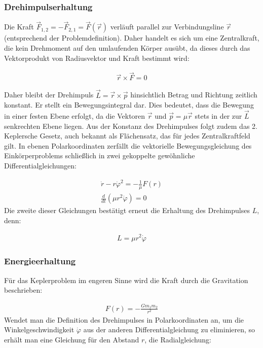 \documentclass[a4paper,12pt,twoside]{article}
\begin{document}
\subsubsection{Drehimpulserhaltung}

Die Kraft \( \vec{F}_{1,2} = -\vec{F}_{2,1} = \vec{F}(\vec{r}) \) verläuft parallel zur Verbindungsline \( \vec{r} \) (entsprechend der Problemdefinition). Daher handelt es sich um eine Zentralkraft, die kein Drehmoment auf den umlaufenden Körper ausübt, da dieses durch das Vektorprodukt von Radiusvektor und Kraft bestimmt wird:

\begin{align*}
	\vec{r} \times \vec{F} = 0
\end{align*}

Daher bleibt der Drehimpuls \( \vec{L} = \vec{r} \times \vec{p} \) hinsichtlich Betrag und Richtung zeitlich konstant. Er stellt ein Bewegungsintegral dar. Dies bedeutet, dass die Bewegung in einer festen Ebene erfolgt, da die Vektoren \( \vec{r} \) und \( \vec{p} = \mu \vec{r} \) stets in der zur \( \vec{L} \) senkrechten Ebene liegen.
Aus der Konstanz des Drehimpulses folgt zudem das 2. Keplersche Gesetz, auch bekannt als Flächensatz, das für jedes Zentralkraftfeld gilt. In ebenen Polarkoordinaten zerfällt die vektorielle Bewegungsgleichung des Einkörperproblems schließlich in zwei gekoppelte gewöhnliche Differentialgleichungen:

\begin{align*}
	\dot{r} - r \dot{\varphi}^2 = - \frac{1}{\mu} F(r) \\
	\frac{d}{dt} \left( \mu r^2 \dot{\varphi} \right) = 0
\end{align*}
Die zweite dieser Gleichungen bestätigt erneut die Erhaltung des Drehimpulses \( L \), denn:

\begin{align*}
	L = \mu r^2 \dot{\varphi}
\end{align*}

\subsubsection{Energieerhaltung}
Für das Keplerproblem im engeren Sinne wird die Kraft durch die Gravitation beschrieben:

\begin{align*}
	F(r) = - \frac{G m_1 m_2}{r^2}
\end{align*}
Wendet man die Definition des Drehimpulses in Polarkoordinaten an, um die Winkelgeschwindigkeit \( \dot{\varphi} \) aus der anderen Differentialgleichung zu eliminieren, so erhält man eine Gleichung für den Abstand \( r \), die Radialgleichung:
\end{document}
